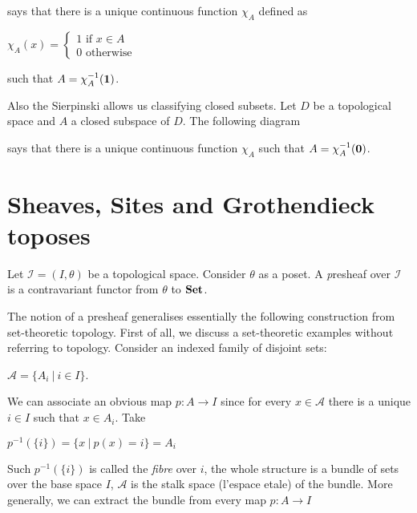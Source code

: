 \documentclass[a4paper]{article}
\theoremstyle{defin}
\theoremstyle{theorem}
\theoremstyle{claim}
\theoremstyle{prop}
\theoremstyle{lemma}
\theoremstyle{fact}
\theoremstyle{ex}
\theoremstyle{col}
\begin{document}

says that there is a unique continuous function $\chi_A$ defined as
\begin{center}
$\chi_A(x) = \begin{cases} 1 \text{  if $x \in A$} \\ 0 \text{  otherwise} \end{cases} $
\end{center}
such that $A = \chi_A^{-1}({\bf 1})$.

Also the Sierpinski allows us classifying closed subsets. Let $D$ be a topological space and $A$ a closed subspace of $D$. The following diagram

says that there is a unique continuous function $\chi_A$ such that $A = \chi_A^{-1}({\bf 0})$.

\section{Sheaves, Sites and Grothendieck toposes}

Let $\mathcal{I} = (I, \theta)$ be a topological space. Consider $\theta$ as a poset. A {\emph presheaf} over $\mathcal{I}$ is a contravariant functor from $\theta$ to ${\bf Set}$.

The notion of a presheaf generalises essentially the following construction from set-theoretic topology. First of all, we discuss a set-theoretic examples without referring to topology. Consider an indexed family of disjoint sets:
\begin{center}
$\mathcal{A} = \{ A_i \: | \: i \in I \}$.
\end{center}
We can associate an obvious map $p : A \to I$ since for every $x \in \mathcal{A}$ there is a unique $i \in I$ such that $x \in A_i$. Take

\begin{center}
$p^{-1}(\{ i \}) = \{ x \: | \: p(x) = i\} = A_i$
\end{center}

Such $p^{-1}(\{ i \})$ is called the \emph{fibre} over $i$, the whole structure is a bundle of sets over the base space $I$, $\mathcal{A}$ is the stalk space (l'espace etale) of the bundle. More generally, we can extract the bundle from every map $p : A \to I$
\end{document}
